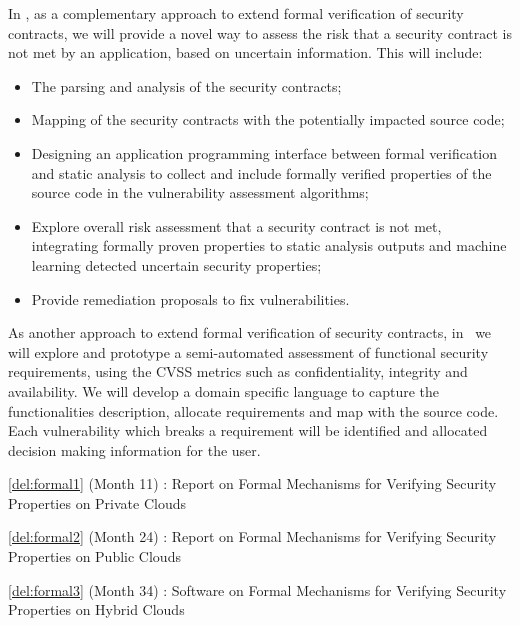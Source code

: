 \begin{Workpackage}{\thewpno}
\begin{Task}
In \theTask, as a complementary approach to extend formal verification of security contracts, we will provide a novel way to assess the risk that a security contract is not met by an application, based on uncertain information. This will include:

\begin{itemize}
\item The parsing and analysis of the security contracts; %
    \item Mapping of the security contracts with the potentially impacted source code;
    \item Designing an application programming interface between formal verification and static analysis to collect and include formally verified properties of the source code in the vulnerability assessment algorithms;
    \item Explore overall risk assessment that a security contract is not met, integrating formally proven properties to static analysis outputs and machine learning detected uncertain security properties;
    \item Provide remediation proposals to fix vulnerabilities.
\end{itemize}

\end{Task}


\begin{Task}

\TaskResults{%
\ref{del:formal1},
\ref{del:formal2},
\ref{del:formal3}
}
\TaskHeader{}

As another approach to extend formal verification of security contracts, in \theTask\ we will explore and prototype a semi-automated assessment of functional security requirements, using the CVSS metrics such as confidentiality, integrity and availability.
We will develop a domain specific language to capture the functionalities description, allocate requirements and map with the source code. Each vulnerability which breaks a requirement will be identified and allocated decision making information for the user.
\end{Task}


\begin{WPDeliverables}
  \begin{compactitem}
  \item \ref{del:formal1} (Month 11) : Report on Formal Mechanisms for Verifying Security Properties on Private Clouds
\item \ref{del:formal2} (Month 24) : Report on Formal Mechanisms for Verifying Security Properties on Public Clouds 
\item \ref{del:formal3} (Month 34) : Software on Formal Mechanisms for Verifying Security Properties on Hybrid Clouds 
\end{compactitem}
\end{WPDeliverables}
\end{Workpackage}
